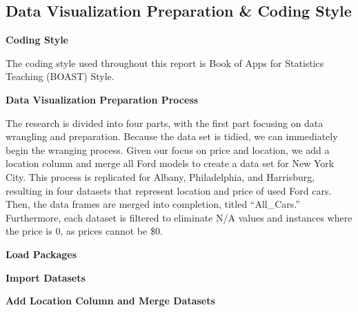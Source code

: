 \documentclass[
]{article}
\begin{document}
\hypertarget{data-visualization-preparation-coding-style}{%
\subsection{Data Visualization Preparation \& Coding
Style}\label{data-visualization-preparation-coding-style}}

\textbf{Coding Style}

The coding style used throughout this report is Book of Apps for
Statistics Teaching (BOAST) Style.

\textbf{Data Visualization Preparation Process}

The research is divided into four parts, with the first part focusing on
data wrangling and preparation. Because the data set is tidied, we can
immediately begin the wranging process. Given our focus on price and
location, we add a location column and merge all Ford models to create a
data set for New York City. This process is replicated for Albany,
Philadelphia, and Harrisburg, resulting in four datasets that represent
location and price of used Ford cars. Then, the data frames are merged
into completion, titled ``All\_Cars.'' Furthermore, each dataset is
filtered to eliminate N/A values and instances where the price is 0, as
prices cannot be \$0.

\textbf{Load Packages}

\textbf{Import Datasets}

\textbf{Add Location Column and Merge Datasets}
\end{document}
